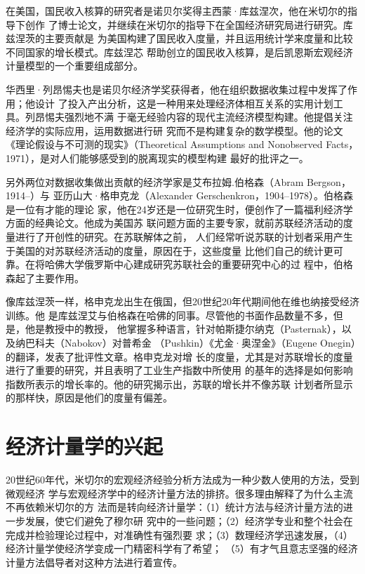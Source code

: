 在美国，国民收入核算的研究者是诺贝尔奖得主西蒙·库兹涅次，他在米切尔的指导下创作
了博士论文，并继续在米切尔的指导下在全国经济研究局进行研究。库兹涅茨的主要贡献是
为美国构建了国民收入度量，并且运用统计学来度量和比较不同国家的增长模式。库兹涅芯
帮助创立的国民收入核算，是后凯恩斯宏观经济计量模型的一个重要组成部分。

华西里·列昂惕夫也是诺贝尔经济学奖获得者，他在组织数据收集过程中发挥了作用；他设计
了投入产出分析，这是一种用来处理经济体相互关系的实用计划工具。列昂惕夫强烈地不满
于毫无经验内容的现代主流经济模型构建。他提倡关注经济学的实际应用，运用数据进行研
究而不是构建复杂的数学模型。他的论文《理论假设与不可测的现实》（Theoretical
Assumptions and Nonobserved Facts，1971），是对人们能够感受到的脱离现实的模型构建
最好的批评之一。

另外两位对数据收集做出贡献的经济学家是艾布拉姆.伯格森（Abram Bergson，1914--）与
亚历山大·格申克龙（Alexander Gerschenkron，1904--1978）。伯格森是一位有才能的理论
家，他在24岁还是一位研究生时，便创作了一篇福利经济学方面的经典论文。他成为美国苏
联问题方面的主要专家，就前苏联经济活动的度量进行了开创性的研究。在苏联解体之前，
人们经常听说苏联的计划者采用产生于美国的对苏联经济活动的度量，原因在于，这些度量
比他们自己的统计更可靠。在将哈佛大学俄罗斯中心建成研究苏联社会的重要研究中心的过
程中，伯格森起了主要作用。

像库兹涅茨一样，格申克龙出生在俄国，但20世纪20年代期间他在维也纳接受经济训练。他
是库兹涅艾与伯格森在哈佛的同事。尽管他的书面作品数量不多，但是，他是教授中的教授，
他掌握多种语言，针对帕斯捷尔纳克（Pasternak），以及纳巴科夫（Nabokov）对普希金
（Pushkin）《尤金·奥涅金》（Eugene Onegin）的翻译，发表了批评性文章。格申克龙对增
长的度量，尤其是对苏联增长的度量进行了重要的研究，并且表明了工业生产指数中所使用
的基年的选择是如何影响指数所表示的增长率的。他的研究揭示出，苏联的增长并不像苏联
计划者所显示的那样快，原因是他们的度量有偏差。

\section{经济计量学的兴起}

20世纪60年代，米切尔的宏观经济经验分析方法成为一种少数人使用的方法，受到微观经济
学与宏观经济学中的经济计量方法的排挤。很多理由解释了为什么主流不再依赖米切尔的方
法而是转向经济计量学：（1）统计方法与经济计量方法的进一步发展，使它们避免了穆尔研
究中的一些问题；（2）经济学专业和整个社会在完成并检验理论过程中，对准确性有强烈要
求；（3）数理经济学迅速发展，（4）经济计量学使经济学变成一门精密科学有了希望；
（5）有才气且意志坚强的经济计量方法倡导者对这种方法进行着宣传。

